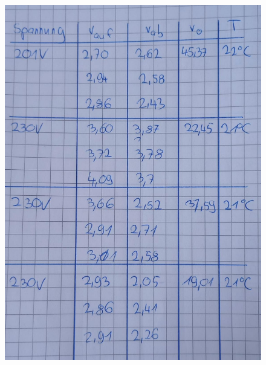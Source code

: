 \begin{figure}[H]
    \centering
    \includegraphics[width=\textwidth]{Bilder/V503.3.jpeg}
\end{figure}

